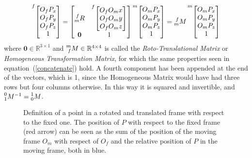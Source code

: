 \documentclass[a4paper,12pt,oneside]{report}
\begin{document}
\begin{equation}
  \prescript{f}{}{\begin{bmatrix}
    O_fP_x\\
    O_fP_y\\
    O_fP_z\\
    1
  \end{bmatrix}}=\begin{bmatrix}
    \prescript{f}{m}{R}&\prescript{f}{}{\begin{bmatrix}
      O_fO_mx\\
      O_fO_my\\
      O_fO_mz\\
    \end{bmatrix}}\\
    \mathbf{0}&1
  \end{bmatrix}\prescript{m}{}{\begin{bmatrix}
      O_mP_x\\
      O_mP_y\\
      O_mP_z\\
      1
    \end{bmatrix}}=\prescript{f}{m}{M}\prescript{m}{}{\begin{bmatrix}
      O_mP_x\\
      O_mP_y\\
      O_mP_z\\
      1
    \end{bmatrix}}
\label{roto_translation}
\end{equation}
where $\mathbf{0} \in \mathbb{R}^{3\times1}$ and $\prescript{m}{f}{M} \in \mathbb{R}^{4\times4}$ is called the \textit{Roto-Translational Matrix} or \textit{Homogeneous Transformation Matrix}, for which the same properties seen in equation~(\ref{concatenate}) hold. A fourth component has been appended at the end of the vectors, which is 1, since the Homogeneous Matrix would have had three rows but four columns otherwise. In this way it is squared and invertible, and $\prescript{0}{1}{M}^{-1}=\prescript{1}{0}{M}$.
\begin{figure}[h]
  \centering
  
  \caption{Definition of a point in a rotated and translated frame with respect to the fixed one. The position of $P$ with respect to the fixed frame (red arrow) can be seen as the sum of the position of the moving frame $O_m$ with respect of $O_f$ and the relative position of $P$ in the moving frame, both in blue.}
  \label{translation}
\end{figure}
\newpage
\end{document}
